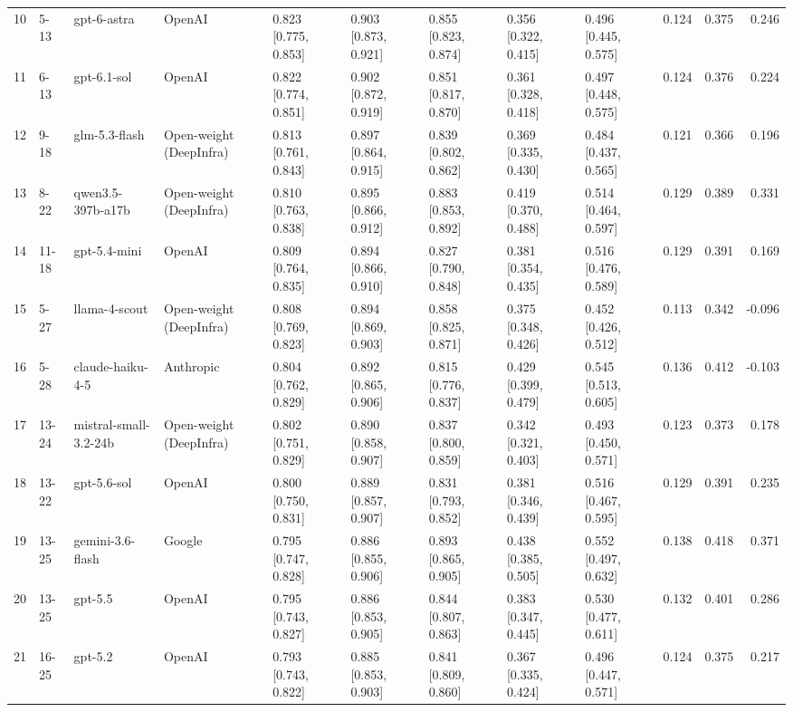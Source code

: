 \begin{table}
\begin{tabular}{rllllllllrrr}
10 & 5-13 & gpt-6-astra & OpenAI & 0.823 [0.775, 0.853] & 0.903 [0.873, 0.921] & 0.855 [0.823, 0.874] & 0.356 [0.322, 0.415] & 0.496 [0.445, 0.575] & 0.124 & 0.375 & 0.246 \\
11 & 6-13 & gpt-6.1-sol & OpenAI & 0.822 [0.774, 0.851] & 0.902 [0.872, 0.919] & 0.851 [0.817, 0.870] & 0.361 [0.328, 0.418] & 0.497 [0.448, 0.575] & 0.124 & 0.376 & 0.224 \\
12 & 9-18 & glm-5.3-flash & Open-weight (DeepInfra) & 0.813 [0.761, 0.843] & 0.897 [0.864, 0.915] & 0.839 [0.802, 0.862] & 0.369 [0.335, 0.430] & 0.484 [0.437, 0.565] & 0.121 & 0.366 & 0.196 \\
13 & 8-22 & qwen3.5-397b-a17b & Open-weight (DeepInfra) & 0.810 [0.763, 0.838] & 0.895 [0.866, 0.912] & 0.883 [0.853, 0.892] & 0.419 [0.370, 0.488] & 0.514 [0.464, 0.597] & 0.129 & 0.389 & 0.331 \\
14 & 11-18 & gpt-5.4-mini & OpenAI & 0.809 [0.764, 0.835] & 0.894 [0.866, 0.910] & 0.827 [0.790, 0.848] & 0.381 [0.354, 0.435] & 0.516 [0.476, 0.589] & 0.129 & 0.391 & 0.169 \\
15 & 5-27 & llama-4-scout & Open-weight (DeepInfra) & 0.808 [0.769, 0.823] & 0.894 [0.869, 0.903] & 0.858 [0.825, 0.871] & 0.375 [0.348, 0.426] & 0.452 [0.426, 0.512] & 0.113 & 0.342 & -0.096 \\
16 & 5-28 & claude-haiku-4-5 & Anthropic & 0.804 [0.762, 0.829] & 0.892 [0.865, 0.906] & 0.815 [0.776, 0.837] & 0.429 [0.399, 0.479] & 0.545 [0.513, 0.605] & 0.136 & 0.412 & -0.103 \\
17 & 13-24 & mistral-small-3.2-24b & Open-weight (DeepInfra) & 0.802 [0.751, 0.829] & 0.890 [0.858, 0.907] & 0.837 [0.800, 0.859] & 0.342 [0.321, 0.403] & 0.493 [0.450, 0.571] & 0.123 & 0.373 & 0.178 \\
18 & 13-22 & gpt-5.6-sol & OpenAI & 0.800 [0.750, 0.831] & 0.889 [0.857, 0.907] & 0.831 [0.793, 0.852] & 0.381 [0.346, 0.439] & 0.516 [0.467, 0.595] & 0.129 & 0.391 & 0.235 \\
19 & 13-25 & gemini-3.6-flash & Google & 0.795 [0.747, 0.828] & 0.886 [0.855, 0.906] & 0.893 [0.865, 0.905] & 0.438 [0.385, 0.505] & 0.552 [0.497, 0.632] & 0.138 & 0.418 & 0.371 \\
20 & 13-25 & gpt-5.5 & OpenAI & 0.795 [0.743, 0.827] & 0.886 [0.853, 0.905] & 0.844 [0.807, 0.863] & 0.383 [0.347, 0.445] & 0.530 [0.477, 0.611] & 0.132 & 0.401 & 0.286 \\
21 & 16-25 & gpt-5.2 & OpenAI & 0.793 [0.743, 0.822] & 0.885 [0.853, 0.903] & 0.841 [0.809, 0.860] & 0.367 [0.335, 0.424] & 0.496 [0.447, 0.571] & 0.124 & 0.375 & 0.217 \\

\end{tabular}
\end{table}

